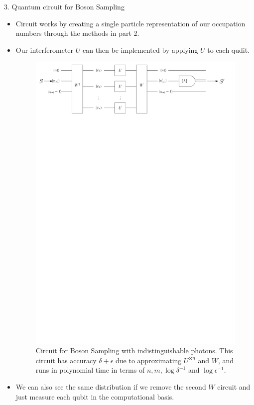\documentclass[]{templates/poster}
\begin{document}
\begin{frame}{}
\begin{columns}[t]
\begin{column}{0.422\linewidth}
  \begin{block}{\Large 3. Quantum circuit for Boson Sampling}
  \begin{itemize}
  \item Circuit works by creating a single particle representation of our occupation numbers through the methods in part 2.
  \item Our interferometer $U$ can then be implemented by applying $U$ to each qudit.
  \begin{center}
  \begin{figure}
  \includegraphics[width=\linewidth]{noiseless_circuit_irrep}
  \caption{\label{fig:noiseless-circuit} Circuit for Boson Sampling with indistinguishable photons. This circuit has accuracy $\delta + \epsilon$ due to approximating $U^{\otimes n}$ and $W$, and runs in polynomial time in terms of $n, m, \log\delta^{-1}$ and $\log\epsilon^{-1}$.}
  \end{figure}
  \end{center}
  \item We can also see the same distribution if we remove the second $W$ circuit and just measure each qubit in the computational basis.
  \end{itemize}
  \end{block}
  \end{column}


\end{columns}
\end{frame}
\end{document}
